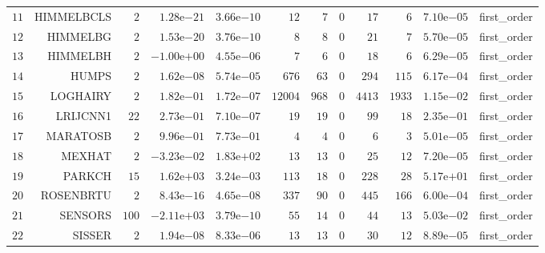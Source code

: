 \begin{longtable}{rrrrrrrrrrrr}
  \(    11\) & HIMMELBCLS & \(     2\) & \( 1.28\)e\(-21\) & \( 3.66\)e\(-10\) & \(    12\) & \(     7\) & \(     0\) & \(    17\) & \(     6\) & \( 7.10\)e\(-05\) & first\_order \\
  \(    12\) & HIMMELBG & \(     2\) & \( 1.53\)e\(-20\) & \( 3.76\)e\(-10\) & \(     8\) & \(     8\) & \(     0\) & \(    21\) & \(     7\) & \( 5.70\)e\(-05\) & first\_order \\
  \(    13\) & HIMMELBH & \(     2\) & \(-1.00\)e\(+00\) & \( 4.55\)e\(-06\) & \(     7\) & \(     6\) & \(     0\) & \(    18\) & \(     6\) & \( 6.29\)e\(-05\) & first\_order \\
  \(    14\) & HUMPS & \(     2\) & \( 1.62\)e\(-08\) & \( 5.74\)e\(-05\) & \(   676\) & \(    63\) & \(     0\) & \(   294\) & \(   115\) & \( 6.17\)e\(-04\) & first\_order \\
  \(    15\) & LOGHAIRY & \(     2\) & \( 1.82\)e\(-01\) & \( 1.72\)e\(-07\) & \( 12004\) & \(   968\) & \(     0\) & \(  4413\) & \(  1933\) & \( 1.15\)e\(-02\) & first\_order \\
  \(    16\) & LRIJCNN1 & \(    22\) & \( 2.73\)e\(-01\) & \( 7.10\)e\(-07\) & \(    19\) & \(    19\) & \(     0\) & \(    99\) & \(    18\) & \( 2.35\)e\(-01\) & first\_order \\
  \(    17\) & MARATOSB & \(     2\) & \( 9.96\)e\(-01\) & \( 7.73\)e\(-01\) & \(     4\) & \(     4\) & \(     0\) & \(     6\) & \(     3\) & \( 5.01\)e\(-05\) & first\_order \\
  \(    18\) & MEXHAT & \(     2\) & \(-3.23\)e\(-02\) & \( 1.83\)e\(+02\) & \(    13\) & \(    13\) & \(     0\) & \(    25\) & \(    12\) & \( 7.20\)e\(-05\) & first\_order \\
  \(    19\) & PARKCH & \(    15\) & \( 1.62\)e\(+03\) & \( 3.24\)e\(-03\) & \(   113\) & \(    18\) & \(     0\) & \(   228\) & \(    28\) & \( 5.17\)e\(+01\) & first\_order \\
  \(    20\) & ROSENBRTU & \(     2\) & \( 8.43\)e\(-16\) & \( 4.65\)e\(-08\) & \(   337\) & \(    90\) & \(     0\) & \(   445\) & \(   166\) & \( 6.00\)e\(-04\) & first\_order \\
  \(    21\) & SENSORS & \(   100\) & \(-2.11\)e\(+03\) & \( 3.79\)e\(-10\) & \(    55\) & \(    14\) & \(     0\) & \(    44\) & \(    13\) & \( 5.03\)e\(-02\) & first\_order \\
  \(    22\) & SISSER & \(     2\) & \( 1.94\)e\(-08\) & \( 8.33\)e\(-06\) & \(    13\) & \(    13\) & \(     0\) & \(    30\) & \(    12\) & \( 8.89\)e\(-05\) & first\_order \\

\end{longtable}
